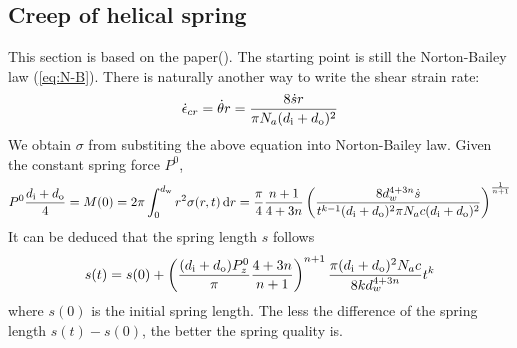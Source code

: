 \documentclass[10pt]{article}
\begin{document}
\subsection{Creep of helical spring}
This section is based on the paper(\cite{Relaxation3}). The starting point is still the Norton-Bailey law (\ref{eq:N-B}). There is naturally another way to write the shear strain rate:
\[
\dot{\epsilon}_{cr} = \dot{\theta} r = {8\dot{s} r\over \pi N_a (d_{\text{i}}+d_{\text{o}})^2}
\]
We obtain $\sigma$ from substiting the above equation into Norton-Bailey law. Given the constant spring force $P^0$,
\[
P^0{d_{\text{i}}+d_{\text{o}}\over 4}=M(0)=2\pi\int_0^{d_{\text{w}}} r^2 \sigma(r,t)\,\mathrm{d} r
={\pi\over 4}{n+1\over 4+3n}\left( {8d_w^{4+3n}\dot{s} \over t^{k-1} (d_{\text{i}}+d_{\text{o}})^2 \pi N_a c (d_{\text{i}}+d_{\text{o}})^2} \right)^{{1\over n+1}}
\]
It can be deduced that the spring length $s$ follows
\[
s(t) = s(0) + \left( {(d_{\text{i}}+d_{\text{o}})P_z^0\over \pi}{4+3n\over n+1} \right)^{n+1} {\pi (d_{\text{i}}+d_{\text{o}})^2 N_a c\over 8kd_w^{4+3n}} t^k
\]
where $s(0)$ is the initial spring length. The less the difference of the spring length $s(t)-s(0)$, the better the spring quality is.
 
 \cite{Ch2000} \cite{Relaxation1} \cite{Relaxation2} \cite{Relaxation3} \cite{Creep} 



\vfill\pagebreak


	
	


\end{document}

